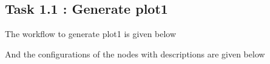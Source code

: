 \documentclass[11pt]{article}
\begin{document}
		\subsection*{Task 1.1 : Generate plot1}
			The workflow to generate plot1 is given below

			And the configurations of the nodes with descriptions are given below
			\iffalse
\end{document}
